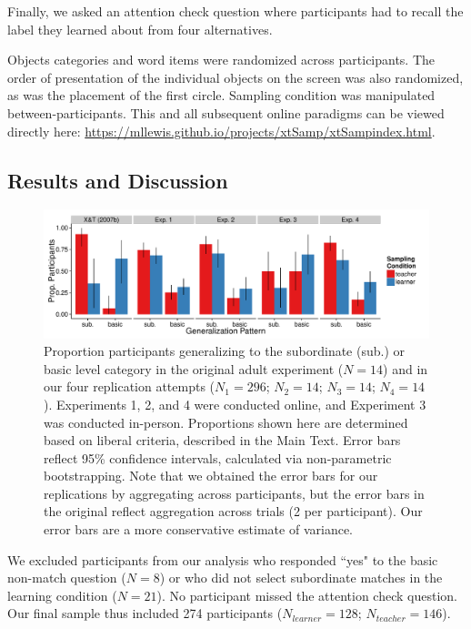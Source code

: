 \documentclass[man]{apa2}
\begin{document}
Finally, we asked an attention check question where participants had to recall the label they learned about from four alternatives.

Objects categories and word items were randomized across participants. The order of presentation of the individual objects on the screen was also randomized, as was the placement of the first circle. Sampling condition was manipulated between-participants.  This and all subsequent online paradigms can be viewed directly here: \url{https://mllewis.github.io/projects/xtSamp/xtSampindex.html}.

\subsection{Results and Discussion}
 \begin{figure} [t]
 \begin{center} 
  \includegraphics[width=6.5in]{figures/FIG_2.pdf} 
  \caption{\label{fig:bar_plots} Proportion participants generalizing to the subordinate (sub.) or basic level category in the original adult experiment ($N = 14$) and in our four replication attempts ($N_{1} = 296$; $N_{2} = 14$; $N_{3}  = 14$; $N_{4}  = 14$).  Experiments 1, 2, and 4 were conducted online, and Experiment 3 was conducted in-person. Proportions shown here are determined based on liberal criteria, described in the Main Text. Error bars reflect 95\% confidence intervals, calculated via non-parametric bootstrapping. Note that we obtained the error bars for our replications by aggregating across participants, but the error bars in the original reflect aggregation across trials (2 per participant). Our error bars are a more conservative estimate of variance. } 
 \end{center} 
\end{figure}

We excluded participants from our analysis who responded ``yes" to the basic non-match question ($N=8$) or who did not select subordinate matches in the learning condition ($N = 21$). No participant missed the attention check question. Our final sample thus included 274 participants ($N_{learner} = 128$; $N_{teacher} = 146$).
\end{document}
